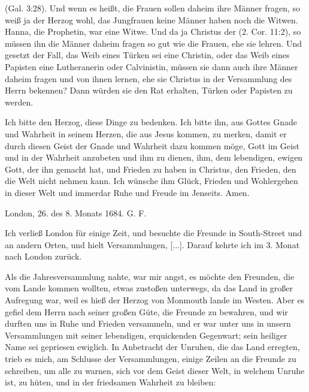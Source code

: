 {     (Gal. 3:28). Und 
    wenn es heißt, die Frauen
    sollen daheim ihre Männer fragen, so weiß ja der Herzog wohl,
    das Jungfrauen keine Männer haben noch die Witwen. Hanna,
    die Prophetin, war eine Witwe. Und da ja Christus der  (2. Cor. 11:2), 
    so müssen ihn die Männer daheim
    fragen so gut wie die Frauen, ehe sie lehren. Und gesetzt der
    Fall, das Weib eines Türken sei eine Christin, oder das Weib
    eines Papisten eine Lutheranerin oder Calvinistin, müssen sie
    dann auch ihre Männer daheim fragen und von ihnen lernen, ehe
    sie Christus in der Versammlung des Herrn bekennen? Dann
    würden sie den Rat erhalten, Türken oder Papisten zu werden.

    Ich bitte den Herzog, diese Dinge zu bedenken. Ich bitte
    ihn, aus Gottes Gnade und Wahrheit in seinem Herzen, die aus
    Jesus kommen, zu merken, damit er durch diesen Geist der
    Gnade und Wahrheit dazu kommen möge, Gott im Geist und in
    der Wahrheit anzubeten und ihm zu dienen, ihm, dem lebendigen,
    ewigen Gott, der ihn gemacht hat, und Frieden zu haben in
    Christus, den Frieden, den die Welt nicht nehmen kann. Ich
    wünsche ihm Glück, Frieden und Wohlergehen in dieser Welt und
    immerdar Ruhe und Freude im Jenseits. Amen.

\bigskip
\begin{flushright}
London, 26. des 8. Monats 1684. G. F.\end{flushright}
}

Ich verließ London für einige Zeit, und besuchte die Freunde
in South-Street und an andern Orten, 
und hielt Versammlungen, [...]. Darauf kehrte ich 
im 3. Monat nach London zurück.

Als die Jahresversammlung nahte, war mir angst, es möchte
den Freunden, die vom Lande kommen wollten, etwas zustoßen
unterwegs, da das Land in großer Aufregung war, weil es hieß
der Herzog von Monmouth lande im Westen. Aber es gefiel
dem Herrn nach seiner großen Güte, die Freunde zu bewahren, und
wir durften uns in Ruhe und Frieden versammeln, und er war unter
uns in unsern Versammlungen mit seiner lebendigen, erquickenden
Gegenwart; sein heiliger Name sei gepriesen ewiglich. In 
Anbetracht der Unruhen, die das Land erregten, trieb es mich, am
Schlusse der Versammlungen, einige Zeilen an die Freunde zu
schreiben, um alle zu warnen, sich vor dem Geist dieser Welt, in
welchem Unruhe ist, zu hüten, und in der friedsamen Wahrheit
zu bleiben:

